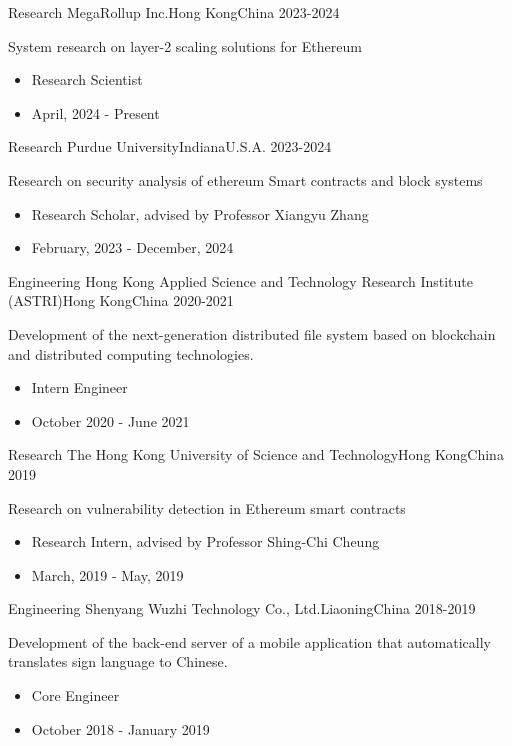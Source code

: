 %
%
%
\begin{experiences}
	\experience
	{Research} {MegaRollup Inc.}{Hong Kong}{China}
	{2023-2024}    {
		System research on layer-2 scaling solutions for Ethereum
		\begin{itemize}
			\item Research Scientist
			\item April, 2024 - Present
		\end{itemize}
	}
	{}

	\experience
	{Research} {Purdue University}{Indiana}{U.S.A.}
	{2023-2024}    {
		Research on security analysis of ethereum Smart contracts and block systems
		\begin{itemize}
			\item Research Scholar, advised by Professor Xiangyu Zhang
			\item February, 2023 - December, 2024
		\end{itemize}
	}
	{}

	\experience
	{Engineering}   {Hong Kong Applied Science and Technology Research Institute (ASTRI)}{Hong Kong}{China}
	{2020-2021} {
		Development of the next-generation distributed file system based on blockchain and distributed computing technologies.
		\begin{itemize}
			\item Intern Engineer
			\item October 2020 - June 2021
		\end{itemize}
	}
	{}

	\experience
	{Research} {The Hong Kong University of Science and Technology}{Hong Kong}{China}
	{2019}    {
		Research on vulnerability detection in Ethereum smart contracts
		\begin{itemize}
			\item Research Intern, advised by Professor Shing-Chi Cheung
			\item March, 2019 - May, 2019
		\end{itemize}
	}
	{}

	\experience
	{Engineering} {Shenyang Wuzhi Technology Co., Ltd.}{Liaoning}{China}
	{2018-2019}    {
		Development of the back-end server of a mobile application that automatically translates sign language to Chinese.
		\begin{itemize}
			\item Core Engineer
			\item October 2018 - January 2019
		\end{itemize}
	}
	{}


\end{experiences}
